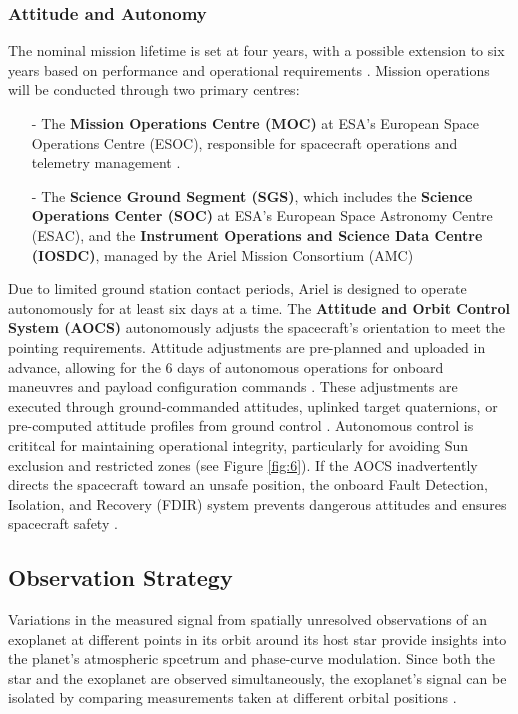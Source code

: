 \documentclass[12pt]{article}
\begin{document}
\subsubsection{Attitude and Autonomy}

The nominal mission lifetime is set at four years, with a possible extension to six years based on performance and operational requirements \cite{salvignol2024ariel}. Mission operations will be conducted through two primary centres:

\begin{itemize}
    \item[-] The \textbf{Mission Operations Centre (MOC)} at ESA's European Space Operations Centre (ESOC), responsible for spacecraft operations and telemetry management \cite{salvignol2024ariel}.
    \item[-] The \textbf{Science Ground Segment (SGS)}, which includes the \textbf{Science Operations Center (SOC)} at ESA's European Space Astronomy Centre (ESAC), and the \textbf{Instrument Operations and Science Data Centre (IOSDC)}, managed by the Ariel Mission Consortium (AMC) \cite{salvignol2024ariel}
\end{itemize}

Due to limited ground station contact periods, Ariel is designed to operate autonomously for at least six days at a time. The \textbf{Attitude and Orbit Control System (AOCS)} autonomously adjusts the spacecraft's orientation to meet the pointing requirements. Attitude adjustments are pre-planned and uploaded in advance, allowing for the 6 days of autonomous operations for onboard maneuvres and payload configuration commands \cite{salvignol2024ariel}.
These adjustments are executed through ground-commanded attitudes, uplinked target quaternions, or pre-computed attitude profiles from ground control \cite{salvignol2024ariel}.
Autonomous control is crititcal for maintaining operational integrity, particularly for avoiding Sun exclusion and restricted zones (see Figure \ref{fig:6}). If the AOCS inadvertently directs the spacecraft toward an unsafe position, the onboard Fault Detection, Isolation, and Recovery (FDIR) system prevents dangerous attitudes and ensures spacecraft safety \cite{salvignol2024ariel}.

\subsection{Observation Strategy}

Variations in the measured signal from spatially unresolved observations of an exoplanet at different points in its orbit around its host star provide insights into the planet's
atmospheric spcetrum and phase-curve modulation. Since both the star and the exoplanet are observed simultaneously, the exoplanet's signal can be isolated by comparing measurements taken at different orbital positions \cite{salvignol2024ariel}.
\end{document}
